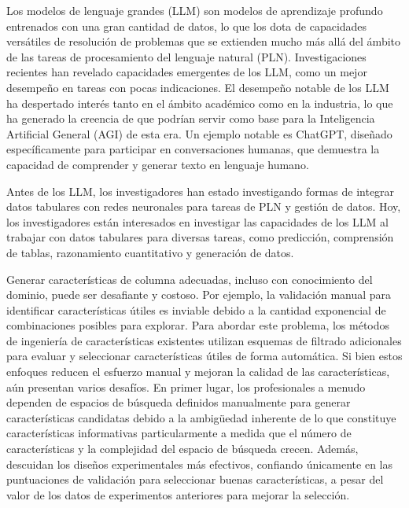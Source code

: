 \documentclass[12pt]{report} %
\begin{document}
Los modelos de lenguaje grandes (LLM) son modelos de aprendizaje profundo entrenados con una gran cantidad de datos, lo que los dota de capacidades versátiles de resolución de problemas que se extienden mucho más allá del ámbito de las tareas de procesamiento del lenguaje natural (PLN). Investigaciones recientes han revelado capacidades emergentes de los LLM, como un mejor desempeño en tareas con pocas indicaciones. El desempeño notable de los LLM ha despertado interés tanto en el ámbito académico como en la industria, lo que ha generado la creencia de que podrían servir como base para la Inteligencia Artificial General (AGI) de esta era. Un ejemplo notable es ChatGPT, diseñado específicamente para participar en conversaciones humanas, que demuestra la capacidad de comprender y generar texto en lenguaje humano.\cite{2}\par
Antes de los LLM, los investigadores han estado investigando formas de integrar datos tabulares con redes neuronales para tareas de PLN y gestión de datos. Hoy, los investigadores están interesados en investigar las capacidades de los LLM al trabajar con datos tabulares para diversas tareas, como predicción, comprensión de tablas, razonamiento cuantitativo y generación de datos. \cite{2}\par
Generar características de columna adecuadas, incluso con conocimiento del dominio, puede ser desafiante y costoso. Por ejemplo, la validación manual para identificar características útiles es inviable debido a la cantidad exponencial de combinaciones posibles para explorar. Para abordar este problema, los métodos de ingeniería de características existentes utilizan esquemas de filtrado adicionales para evaluar y seleccionar características útiles de forma automática. Si bien estos enfoques reducen el esfuerzo manual y mejoran la calidad de las características, aún presentan varios desafíos. En primer lugar, los profesionales a menudo dependen de espacios de búsqueda definidos manualmente para generar características candidatas debido a la ambigüedad inherente de lo que constituye características informativas particularmente a medida que el número de características y la complejidad del espacio de búsqueda crecen. Además, descuidan los diseños experimentales más efectivos, confiando únicamente en las puntuaciones de validación para seleccionar buenas características, a pesar del valor de los datos de experimentos anteriores para mejorar la selección. \cite{3}\par
\end{document}
